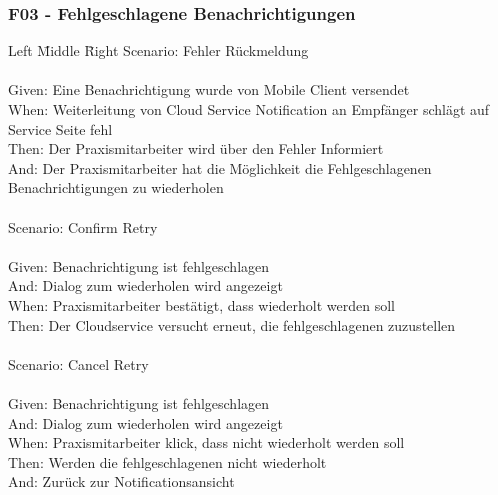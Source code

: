 \clearpage
\subsubsection*{F03 - Fehlgeschlagene Benachrichtigungen}

\begin{tabbing}
    Left \= Middle \= Right \kill
    Scenario: \> \>  Fehler Rückmeldung\\ \\
    Given: \> \>   Eine Benachrichtigung wurde von Mobile Client versendet\\
    When: \> \>    Weiterleitung von Cloud Service Notification an Empfänger schlägt auf Service Seite fehl\\
    Then: \> \>    Der Praxismitarbeiter wird über den Fehler Informiert\\
    And: \> \>     Der Praxismitarbeiter hat die Möglichkeit die Fehlgeschlagenen Benachrichtigungen zu wiederholen\\
    \\
    Scenario: \> \>  Confirm Retry\\ \\
    Given: \> \>   Benachrichtigung ist fehlgeschlagen\\
    And: \> \>     Dialog zum wiederholen wird angezeigt\\
    When: \> \>    Praxismitarbeiter bestätigt, dass wiederholt werden soll\\
    Then: \> \>    Der Cloudservice versucht erneut, die fehlgeschlagenen zuzustellen\\
    \\
    Scenario: \> \>  Cancel Retry\\ \\
    Given: \> \>   Benachrichtigung ist fehlgeschlagen\\
    And: \> \>     Dialog zum wiederholen wird angezeigt\\
    When: \> \>    Praxismitarbeiter klick, dass nicht wiederholt werden soll\\
    Then: \> \>    Werden die fehlgeschlagenen nicht wiederholt\\
    And: \> \>     Zurück zur Notificationsansicht\\

\end{tabbing}

